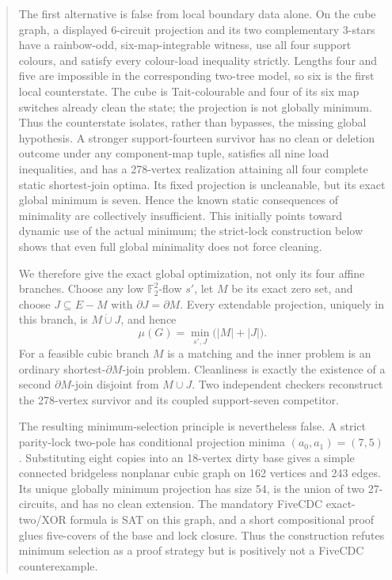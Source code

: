 \documentclass[11pt]{article}
\theoremstyle{definition}
\theoremstyle{remark}
\newcommand{\F}{\mathbb F}
\begin{document}
\begin{abstract}
The first alternative is false from local boundary data alone.  On the
cube graph, a displayed 6-circuit projection and its two complementary
3-stars have a rainbow-odd, six-map-integrable witness, use all four
support colours, and satisfy every colour-load inequality strictly.
Lengths four and five are impossible in the corresponding two-tree
model, so six is the first local counterstate.  The cube is
Tait-colourable and four of its six map switches already clean the state;
the projection is not globally minimum.  Thus the counterstate isolates,
rather than bypasses, the missing global hypothesis.
A stronger support-fourteen survivor has no clean or deletion outcome
under any component-map tuple, satisfies all nine load inequalities, and
has a 278-vertex realization attaining all four complete static
shortest-join optima.  Its fixed projection is uncleanable, but its exact
global minimum is seven.  Hence the known static consequences of
minimality are collectively insufficient.  This initially points toward
dynamic use of the actual minimum; the strict-lock construction below
shows that even full global minimality does not force cleaning.

We therefore give the exact global optimization, not only its four
affine branches.  Choose any low \(\F_2^2\)-flow \(s'\), let \(M\) be
its exact zero set, and choose \(J\subseteq E-M\) with
\(\partial J=\partial M\).  Every extendable projection, uniquely in
this branch, is \(M\mathbin{\dot\cup}J\), and hence
\[
 \mu(G)=\min_{s',J}\bigl(|M|+|J|\bigr).
\]
For a feasible cubic branch \(M\) is a matching and the inner problem is
an ordinary shortest-\(\partial M\)-join problem.  Cleanliness is exactly
the existence of a second \(\partial M\)-join disjoint from
\(M\cup J\).  Two independent checkers reconstruct the 278-vertex
survivor and its coupled support-seven competitor.

The resulting minimum-selection principle is nevertheless false.  A
strict parity-lock two-pole has conditional projection minima
\((a_0,a_1)=(7,5)\).  Substituting eight copies into an 18-vertex dirty
base gives a simple connected bridgeless nonplanar cubic graph on 162
vertices and 243 edges.  Its unique globally minimum projection has size
54, is the union of two 27-circuits, and has no clean extension.
The mandatory FiveCDC exact-two/XOR formula is SAT on this graph, and a
short compositional proof glues five-covers of the base and lock closure.
Thus the construction refutes minimum selection as a proof strategy but
is positively not a FiveCDC counterexample.


\end{abstract}
\end{document}
